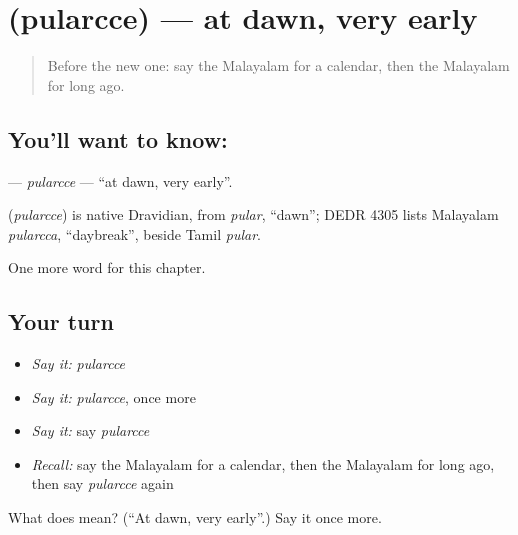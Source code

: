\section[\texorpdfstring{\ml{പുലർച്ചെ} (pularcce)}{പുലർച്ചെ (pularcce)}]{ (pularcce) — at dawn, very early}

\label{lesson:ML-C314-pularcce}



\begin{quote}
Before the new one: say the Malayalam for a calendar, then the Malayalam for long ago.
\end{quote}

\subsection*{You'll want to know: }
\textbf{} — \emph{pularcce} — \textquotedblleft{}at dawn, very early\textquotedblright{}.

\begin{cousinweb}
\textbf{} (\emph{pularcce}) is native Dravidian, from \emph{pular}, \textquotedblleft{}dawn\textquotedblright{}; DEDR 4305 lists Malayalam \emph{pularcca}, \textquotedblleft{}daybreak\textquotedblright{}, beside Tamil \emph{pular}.
\end{cousinweb}

\begin{grammarlens}[title={What you've built}]
One more word for this chapter.
\end{grammarlens}

\subsection*{Your turn}
\begin{itemize}
\raggedright
  \item \emph{Say it:} \emph{pularcce}
  \item \emph{Say it:} \emph{pularcce}, once more
  \item \emph{Say it:} say \emph{pularcce}
  \item \emph{Recall:} say the Malayalam for a calendar, then the Malayalam for long ago, then say \emph{pularcce} again
\end{itemize}

\begin{tcolorbox}[breakable,colback=teal!4,colframe=teal!35!black,title={Before you move on}]
What does  mean? (\textquotedblleft{}At dawn, very early\textquotedblright{}.) Say it once more.
\end{tcolorbox}
